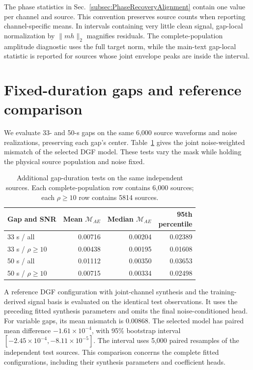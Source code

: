 \documentclass[10pt,prd,aps,a4paper,twocolumn,superscriptaddress,nofootinbib,floatfix]{revtex4-2}
\begin{document}
The phase statistics in Sec.~\ref{subsec:PhaseRecoveryAlignment} contain one value per channel and source. This convention preserves source counts when reporting channel-specific means. In intervals containing very little clean signal, gap-local normalization by $\|mh\|_2$ magnifies residuals. The complete-population amplitude diagnostic uses the full target norm, while the main-text gap-local statistic is reported for sources whose joint envelope peaks are inside the interval.

\section{Fixed-duration gaps and reference comparison}\label{app:fixed_gaps}
We evaluate 33- and 50-s gaps on the same 6,000 source waveforms and noise realizations, preserving each gap's center. Table~\ref{tab:fixed_gaps} gives the joint noise-weighted mismatch of the selected DGF model. These tests vary the mask while holding the physical source population and noise fixed.
\begin{table}[t]\centering\setlength{\tabcolsep}{2pt}
\caption{Additional gap-duration tests on the same independent sources. Each complete-population row contains 6,000 sources; each $\rho\ge10$ row contains 5814 sources.}\label{tab:fixed_gaps}
\begin{tabular}{lrrr}\hline\hline
Gap and SNR & Mean $\mathcal M_{AE}$ & Median $\mathcal M_{AE}$ & \shortstack{95th\\percentile}\\\hline
33 s / all & 0.00716 & 0.00204 & 0.02389\\
33 s / $\rho\ge10$ & 0.00438 & 0.00195 & 0.01608\\
50 s / all & 0.01112 & 0.00350 & 0.03653\\
50 s / $\rho\ge10$ & 0.00715 & 0.00334 & 0.02498\\
\hline\hline\end{tabular}\end{table}

A reference DGF configuration with joint-channel synthesis and the training-derived signal basis is evaluated on the identical test observations. It uses the preceding fitted synthesis parameters and omits the final noise-conditioned head. For variable gaps, its mean mismatch is 0.00868. The selected model has paired mean difference $-1.61\times10^{-4}$, with 95\% bootstrap interval $[-2.45\times10^{-4},-8.11\times10^{-5}]$. The interval uses 5,000 paired resamples of the independent test sources. This comparison concerns the complete fitted configurations, including their synthesis parameters and coefficient heads.

\clearpage

\end{document}
